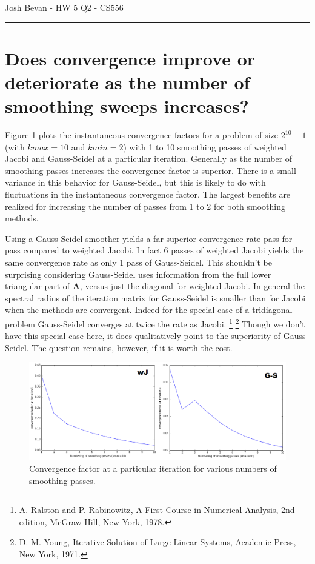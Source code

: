 \documentclass[letterpaper,10pt]{article}
\begin{document}
\begin{flushright}
{\Large Josh Bevan - HW 5 Q2 - CS556}
\end{flushright}
\vskip -0.1in
\hrule
\vskip 0.3in

\section*{Does convergence improve or deteriorate as the number of smoothing sweeps increases?}
Figure 1 plots the instantaneous convergence factors for a problem of size $2^{10}-1$ (with $kmax=10$ and $kmin=2$) with 1 to 10 smoothing passes of weighted Jacobi and Gauss-Seidel at a particular iteration. Generally as the number of smoothing passes increases the convergence factor is superior. There is a small variance in this behavior for Gauss-Seidel, but this is likely to do with fluctuations in the instantaneous convergence factor. The largest benefits are realized for increasing the number of passes from 1 to 2 for both smoothing methods. 

Using a Gauss-Seidel smoother yields a far superior convergence rate pass-for-pass compared to weighted Jacobi. In fact 6 passes of weighted Jacobi yields the same convergence rate as only 1 pass of Gauss-Seidel. This shouldn't be surprising considering Gauss-Seidel uses information from the full lower triangular part of $\mathbf{A}$, versus just the diagonal for weighted Jacobi. In general the spectral radius of the iteration matrix for Gauss-Seidel is smaller than for Jacobi when the methods are convergent. Indeed for the special case of a tridiagonal problem Gauss-Seidel converges at twice the rate as Jacobi. \footnote{A. Ralston and P. Rabinowitz, A First Course in Numerical Analysis, 2nd edition, McGraw-Hill, New York, 1978.} \footnote{D. M. Young, Iterative Solution of Large Linear Systems, Academic Press, New York, 1971.} Though we don't have this special case here, it does qualitatively point to the superiority of Gauss-Seidel. The question remains, however, if it is worth the cost.

\begin{figure}[!htb]
\centering
\includegraphics[width=1\textwidth]{cnvgJG.PNG}
\caption{Convergence factor at a particular iteration for various numbers of smoothing passes.}
\end{figure}
\end{document}
